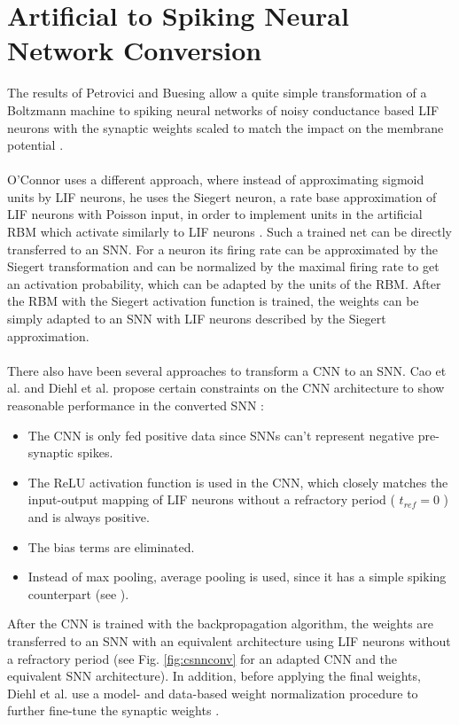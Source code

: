 \section{Artificial to Spiking Neural Network Conversion} \label{c:nnconversion}

The results of Petrovici and Buesing allow a quite simple transformation of a Boltzmann machine to spiking neural networks of noisy conductance based LIF neurons with the synaptic weights scaled to match the impact on the membrane potential \cite{Petrovici2016}.
\\
\\
O'Connor uses a different approach, where instead of approximating sigmoid units by LIF neurons, he uses the Siegert neuron, a rate base approximation of LIF neurons with Poisson input, in order to implement units in the artificial RBM which activate similarly to LIF neurons \cite{OConnor2013}. 
Such a trained net can be directly transferred to an SNN.
For a neuron its firing rate can be approximated by the Siegert transformation and can be normalized by the maximal firing rate to get an activation probability, which can be adapted by the units of the RBM. 
After the RBM with the Siegert activation function is trained, the weights can be simply adapted to an SNN with LIF neurons described by the Siegert approximation.
\\
\\
There also have been several approaches to transform a CNN to an SNN.  
Cao et al. and Diehl et al. propose certain constraints on the CNN architecture to show reasonable performance in the converted SNN \cite{Cao2014, Diehl2015}:
\begin{itemize}
\item The CNN is only fed positive data since SNNs can't represent negative pre-synaptic spikes. 
\item The ReLU activation function is used in the CNN, which closely matches the input-output mapping of LIF neurons without a refractory period ( $t_{ref}=0$ ) and is always positive.
\item The bias terms are eliminated.
\item Instead of max pooling, average pooling is used, since it has a simple spiking counterpart (see \cite{Cao2014}).
\end{itemize}
After the CNN is trained with the backpropagation algorithm, the weights are transferred to an SNN with an equivalent architecture using LIF neurons without a refractory period (see Fig. \ref{fig:csnnconv} for an adapted CNN and the equivalent SNN architecture). 
In addition, before applying the final weights, Diehl et al. use a model- and data-based weight normalization procedure to further fine-tune the synaptic weights \cite{Diehl2015}. 

